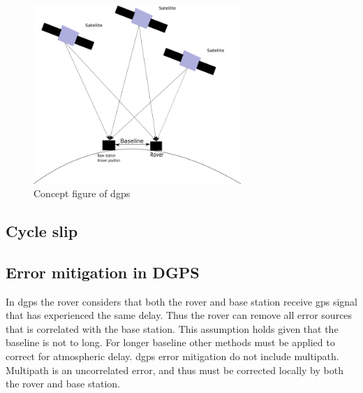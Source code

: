 \begin{figure}[H]
	\centering
		\includegraphics[width=0.7\textwidth]{figs/DGPS.png}
		\caption{Concept figure of \acrfull{dgps}}
		\label{figure:DGPS}
\end{figure}

\subsection{Cycle slip}\label{ss:cycleSlip}

\subsection{Error mitigation in DGPS} \label{ss: Error mitigation DGPS}
In \gls{dgps} the rover considers that both the rover and base station receive \gls{gps} signal that has experienced the same delay. Thus the rover can remove all error sources that is correlated with the base station. This assumption holds given that the baseline is not to long. For longer baseline other methods must be applied to correct for atmospheric delay. \gls{dgps} error mitigation do not include multipath. Multipath is an uncorrelated error, and thus must be corrected locally by both the rover and base station.


